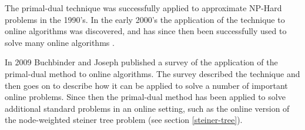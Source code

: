 The primal-dual technique was successfully applied to approximate NP-Hard problems in the 1990's.
In the early 2000's the application of the technique to online algorithms was discovered, and has since then been successfully used to solve many online algorithms .

In 2009 Buchbinder and Joseph published a survey of the application of the primal-dual method to online algorithms.
The survey described the technique and then goes on to describe how it can be applied to solve a number of important online problems.
Since then the primal-dual method has been applied to solve additional standard problems in an online setting, such as the online version of the node-weighted steiner tree problem (see section \ref{steiner-tree}).
